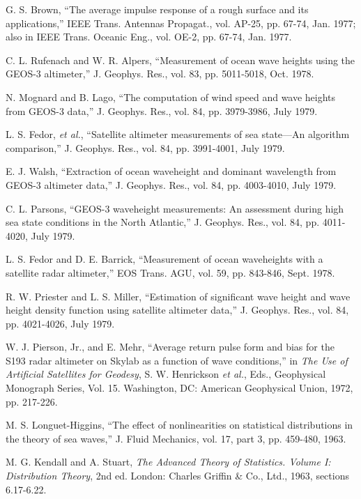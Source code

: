 {\wuhao
\setlength{\parindent}{0pt}
\noindent[1] G. S. Brown, ``The average impulse response of a rough surface and its applications,'' IEEE Trans. Antennas Propagat., vol. AP-25, pp. 67-74, Jan. 1977; also in IEEE Trans. Oceanic Eng., vol. OE-2, pp. 67-74, Jan. 1977.\par
\noindent[2] C. L. Rufenach and W. R. Alpers, ``Measurement of ocean wave heights using the GEOS-3 altimeter,'' J. Geophys. Res., vol. 83, pp. 5011-5018, Oct. 1978.\par
\noindent[3] N. Mognard and B. Lago, ``The computation of wind speed and wave heights from GEOS-3 data,'' J. Geophys. Res., vol. 84, pp. 3979-3986, July 1979.\par
\noindent[4] L. S. Fedor, \emph{et al.}, ``Satellite altimeter measurements of sea state---An algorithm comparison,'' J. Geophys. Res., vol. 84, pp. 3991-4001, July 1979.\par
\noindent[5] E. J. Walsh, ``Extraction of ocean waveheight and dominant wavelength from GEOS-3 altimeter data,'' J. Geophys. Res., vol. 84, pp. 4003-4010, July 1979.\par
\noindent[6] C. L. Parsons, ``GEOS-3 waveheight measurements: An assessment during high sea state conditions in the North Atlantic,'' J. Geophys. Res., vol. 84, pp. 4011-4020, July 1979.\par
\noindent[7] L. S. Fedor and D. E. Barrick, ``Measurement of ocean waveheights with a satellite radar altimeter,'' EOS Trans. AGU, vol. 59, pp. 843-846, Sept. 1978.\par
\noindent[8] R. W. Priester and L. S. Miller, ``Estimation of significant wave height and wave height density function using satellite altimeter data,'' J. Geophys. Res., vol. 84, pp. 4021-4026, July 1979.\par
\noindent[9] W. J. Pierson, Jr., and E. Mehr, ``Average return pulse form and bias for the S193 radar altimeter on Skylab as a function of wave conditions,'' in \emph{The Use of Artificial Satellites for Geodesy}, S. W. Henrickson \emph{et al.}, Eds., Geophysical Monograph Series, Vol. 15. Washington, DC: American Geophysical Union, 1972, pp. 217-226.\par
\noindent[10] M. S. Longuet-Higgins, ``The effect of nonlinearities on statistical distributions in the theory of sea waves,'' J. Fluid Mechanics, vol. 17, part 3, pp. 459-480, 1963.\par
\noindent[11] M. G. Kendall and A. Stuart, \emph{The Advanced Theory of Statistics. Volume I: Distribution Theory}, 2nd ed. London: Charles Griffin \& Co., Ltd., 1963, sections 6.17-6.22.\par
}
